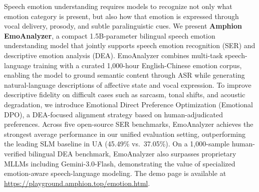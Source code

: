 Speech emotion understanding requires models to recognize not only what emotion category is present, but also how that emotion is expressed through vocal delivery, prosody, and subtle paralinguistic cues. We present \textbf{Amphion EmoAnalyzer}, a compact 1.5B-parameter bilingual speech emotion understanding model that jointly supports speech emotion recognition (SER) and descriptive emotion analysis (DEA). EmoAnalyzer combines multi-task speech-language training with a curated 1,000-hour English-Chinese emotion corpus, enabling the model to ground semantic content through ASR while generating natural-language descriptions of affective state and vocal expression. To improve descriptive fidelity on difficult cases such as sarcasm, tonal shifts, and acoustic degradation, we introduce Emotional Direct Preference Optimization (Emotional DPO), a DEA-focused alignment strategy based on human-adjudicated preferences. Across five open-source SER benchmarks, EmoAnalyzer achieves the strongest average performance in our unified evaluation setting, outperforming the leading SLM baseline in UA (45.49\% vs.\ 37.05\%). On a 1,000-sample human-verified bilingual DEA benchmark, EmoAnalyzer also surpasses proprietary MLLMs including Gemini-3.0-Flash, demonstrating the value of specialized emotion-aware speech-language modeling. The demo page is available at \url{https://playground.amphion.top/emotion.html}.
